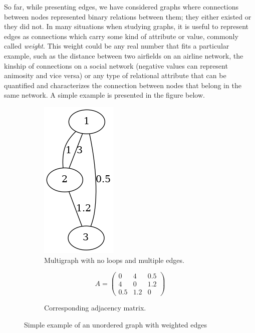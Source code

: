 So far, while presenting edges, we have considered graphs where
connections between nodes represented binary relations between them;
they either existed or they did not. In many situations when studying
graphs, it is useful to represent edges as connections which carry some
kind of attribute or value, commonly called \textit{weight}. This weight
could be any real number that fits a particular example, such as the distance
between two airfields on an airline network, the kinship of connections
on a social network (negative values can represent animosity and vice versa)
or any type of relational attribute that can be quantified and
characterizes the connection between nodes that belong in the same
network\cite[p.~109]{book:Newman}. A simple example is presented in
the figure below.
\begin{figure}[h]
     \begin{subfigure}[c]{0.4\textwidth}
         \centering
         \includegraphics[scale=0.5]{Figures/chapter1/simple_weighted.png}
         \caption{Multigraph with no loops and multiple edges.}
         \label{fig:simple_adj_demo}
     \end{subfigure}
     \hfill
     \begin{subfigure}[c]{0.4\textwidth}
       \centering
       \begin{equation*}
         A = 
        \begin{pmatrix}
        0 & 4 & 0.5 \\
        4 & 0 & 1.2 \\
        0.5 & 1.2 & 0 
        \end{pmatrix}  
\end{equation*}
\newline
\newline
\newline
\newline
\newline
\caption{Corresponding adjacency matrix.}
\label{table:weighted_adj}
\end{subfigure}
  \caption{Simple example of an unordered graph with weighted edges}
  \label{fig:weighted_graph}
\end{figure}

